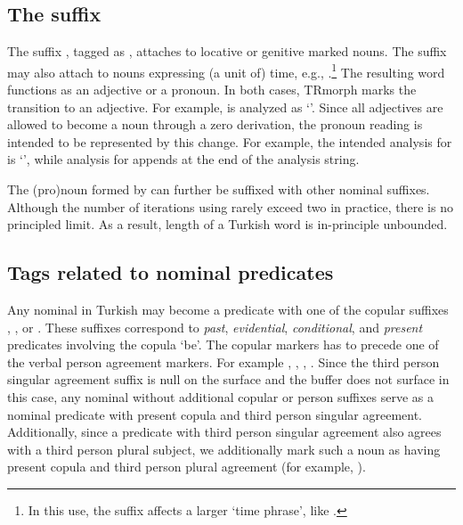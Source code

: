 \documentclass[twocolumn]{article}
\begin{document}
\subsection{\label{ssec:ki}The suffix }

The suffix , tagged as , attaches to locative
or genitive marked nouns. The suffix may also attach to nouns expressing 
(a unit of) time, e.g., .\footnote{In this use,
the suffix affects a larger `time phrase', like .} The resulting word functions as an
adjective or a pronoun. In both cases, TRmorph marks the transition to
an adjective. For example,  is analyzed as
`'. Since all adjectives are
allowed to become a noun through a zero derivation, the pronoun
reading is intended to be represented by this change. For example, the
intended analysis for  is
`',
while analysis for  appends  at the end of the analysis
string.

The (pro)noun formed by  can further be suffixed with other
nominal suffixes. Although the number of iterations using 
rarely exceed two in practice, there is no principled limit.  As a
result, length of a Turkish word is in-principle unbounded. 

\subsection{\label{ssec:nompred}Tags related to nominal predicates}

Any nominal in Turkish may become a predicate with one of the
copular suffixes , ,  or
. These suffixes correspond to \emph{past},
\emph{evidential}, \emph{conditional}, and \emph{present} predicates
involving the copula `be'. The copular markers has to precede one of
the verbal person agreement markers. For example
,
,
,
. Since the third person
singular agreement suffix is null on the surface and the buffer
 does not surface in this case, any nominal without
additional copular or person suffixes serve as a nominal predicate
with present copula and third person singular agreement. Additionally,
since a predicate with third person singular agreement also agrees
with a third person plural subject, we additionally mark such a noun
as having present copula and third person plural agreement (for
example, ). 
\end{document}
